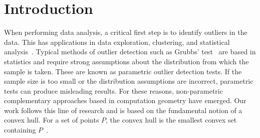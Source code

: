 \documentclass{cccg24}
\begin{document}
\section{Introduction}
When performing data analysis, a critical first step is to identify outliers in the data. This has applications in data exploration, clustering, and statistical analysis~\cite{data_exploration_zuur2010protocol, clustering_DAVE1991657, statistical_analysis_kwak2017statistical}.
Typical methods of outlier detection such as Grubbs' test~\cite {grubbs1949sample} are based in statistics and require strong assumptions about the distribution from which the sample is taken. 
These are known as parametric outlier detection tests.
If the sample size is too small or the distribution assumptions are incorrect, parametric tests can produce misleading results. 
For these reasons, non-parametric complementary approaches based in computation geometry have emerged. 
Our work follows this line of research and is based on the fundamental notion of a convex hull. 
For a set of points $P$, the convex hull is the smallest convex set containing $P$~\cite{de2000computational}. 
\end{document}
